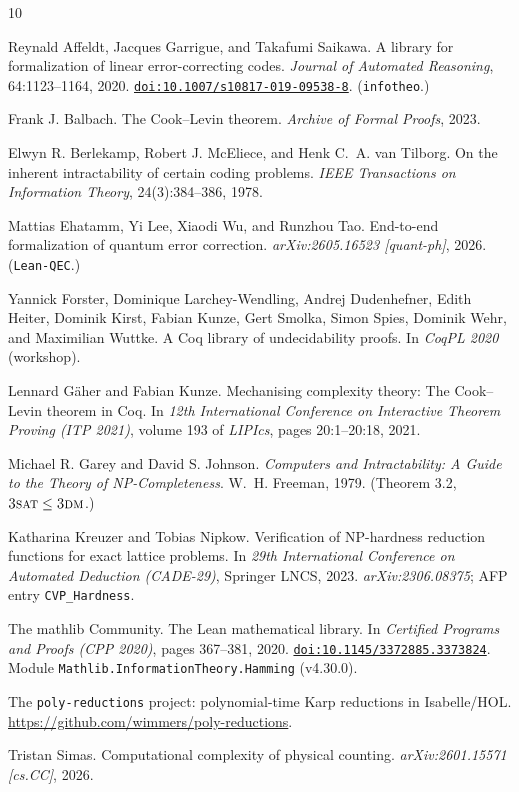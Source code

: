 \documentclass[a4paper,UKenglish,cleveref,autoref]{lipics-v2021}
\providecommand{\doi}[1]{\href{https://doi.org/#1}{\texttt{doi:#1}}}
\begin{document}
\begin{thebibliography}{10}

Reynald Affeldt, Jacques Garrigue, and Takafumi Saikawa.
\newblock A library for formalization of linear error-correcting codes.
\newblock \emph{Journal of Automated Reasoning}, 64:1123--1164, 2020.
\newblock \doi{10.1007/s10817-019-09538-8}. (\texttt{infotheo}.)

Frank J. Balbach.
\newblock The Cook--Levin theorem.
\newblock \emph{Archive of Formal Proofs}, 2023.

Elwyn R. Berlekamp, Robert J. McEliece, and Henk C.~A. van Tilborg.
\newblock On the inherent intractability of certain coding problems.
\newblock \emph{IEEE Transactions on Information Theory}, 24(3):384--386, 1978.

Mattias Ehatamm, Yi Lee, Xiaodi Wu, and Runzhou Tao.
\newblock End-to-end formalization of quantum error correction.
\newblock \emph{arXiv:2605.16523 [quant-ph]}, 2026. (\texttt{Lean-QEC}.)

Yannick Forster, Dominique Larchey-Wendling, Andrej Dudenhefner, Edith Heiter, Dominik Kirst, Fabian Kunze,
Gert Smolka, Simon Spies, Dominik Wehr, and Maximilian Wuttke.
\newblock A Coq library of undecidability proofs.
\newblock In \emph{CoqPL 2020} (workshop).

Lennard Gäher and Fabian Kunze.
\newblock Mechanising complexity theory: The Cook--Levin theorem in Coq.
\newblock In \emph{12th International Conference on Interactive Theorem Proving (ITP 2021)}, volume 193 of
\emph{LIPIcs}, pages 20:1--20:18, 2021.

Michael R. Garey and David S. Johnson.
\newblock \emph{Computers and Intractability: A Guide to the Theory of NP-Completeness}.
\newblock W.~H. Freeman, 1979. (Theorem 3.2, $\textsc{3sat} \le \textsc{3dm}$.)

Katharina Kreuzer and Tobias Nipkow.
\newblock Verification of NP-hardness reduction functions for exact lattice problems.
\newblock In \emph{29th International Conference on Automated Deduction (CADE-29)}, Springer LNCS, 2023.
\newblock \emph{arXiv:2306.08375}; AFP entry \texttt{CVP\_Hardness}.

The mathlib Community.
\newblock The Lean mathematical library.
\newblock In \emph{Certified Programs and Proofs (CPP 2020)}, pages 367--381, 2020.
\newblock \doi{10.1145/3372885.3373824}. Module \texttt{Mathlib.InformationTheory.Hamming} (v4.30.0).

The \texttt{poly-reductions} project: polynomial-time Karp reductions in Isabelle/HOL.
\newblock \url{https://github.com/wimmers/poly-reductions}.

Tristan Simas.
\newblock Computational complexity of physical counting.
\newblock \emph{arXiv:2601.15571 [cs.CC]}, 2026.

\end{thebibliography}
\end{document}
